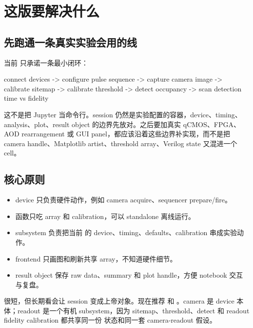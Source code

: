 \documentclass[11pt,oneside,openany]{book}
\begin{document}
\frontmatter
{}
\tableofcontents
\cleardoublepage
\mainmatter


\chapter{这版要解决什么}
\section{先跑通一条真实实验会用的线}
当前  只承诺一条最小闭环：

\begin{codeblock}
connect devices
  -> configure pulse sequence
  -> capture camera image
  -> calibrate sitemap
  -> calibrate threshold
  -> detect occupancy
  -> scan detection time vs fidelity
\end{codeblock}

这不是把 Jupyter 当命令行。session 仍然是实验配置的容器，device、timing、analysis、plot、result object 的边界先放对。之后要加真实 qCMOS、FPGA、AOD rearrangement 或 GUI panel，都应该沿着这些边界补实现，而不是把 camera handle、Matplotlib artist、threshold array、Verilog state 又混进一个 cell。

\section{核心原则}
\begin{itemize}
  \item device 只负责硬件动作，例如 camera acquire、sequencer prepare/fire。
  \item {} 函数只吃 array 和 calibration，可以 standalone 离线运行。
  \item subsystem 负责把当前  的 device、timing、defaults、calibration 串成实验动作。
  \item frontend 只画图和刷新共享 array，不知道硬件细节。
  \item result object 保存 raw data、summary 和 plot handle，方便 notebook 交互与复盘。
\end{itemize}

\begin{notebox}
 很短，但长期看会让 session 变成上帝对象。现在推荐  和 。camera 是 device 本体；readout 是一个有机 subsystem，因为 sitemap、threshold、detect 和 readout fidelity calibration 都共享同一份  状态和同一套 camera-readout 假设。
\end{notebox}
\end{document}
